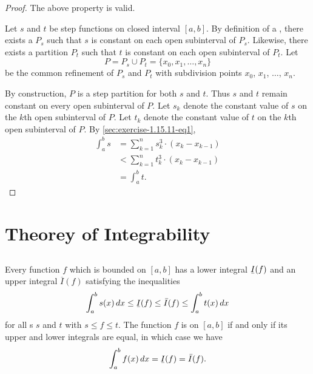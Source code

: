 \documentclass{report}
\newcommand{\ubar}[1]{\text{\b{$#1$}}}
\begin{document}
\begin{proof}

  The above property is valid.

  \divider

  Let $s$ and $t$ be step functions on closed interval $[a, b]$.
  By definition of a , there exists a 
    $P_s$ such that $s$ is constant on each open subinterval of $P_s$.
  Likewise, there exists a partition $P_t$ such that $t$ is constant on each
    open subinterval of $P_t$.
  Let $$P = P_s \cup P_t = \{x_0, x_1, \ldots, x_n\}$$ be the common refinement
    of $P_s$ and $P_t$ with subdivision points $x_0$, $x_1$, $\ldots$, $x_n$.

  By construction, $P$ is a step partition for both $s$ and $t$.
  Thus $s$ and $t$ remain constant on every open subinterval of $P$.
  Let $s_k$ denote the constant value of $s$ on the $k$th open subinterval of
    $P$.
  Let $t_k$ denote the constant value of $t$ on the $k$th open subinterval of
    $P$.
  By \eqref{sec:exercise-1.15.11-eq1},
    \begin{align*}
      \int_a^b s
        & = \sum_{k=1}^n s_k^3 \cdot (x_k - x_{k-1}) \\
        & < \sum_{k=1}^n t_k^3 \cdot (x_k - x_{k-1}) \\
        & = \int_a^b t.
    \end{align*}

\end{proof}

\chapter{Theorey of Integrability}%
\label{chap:theory-integrability}

\section{}%
\label{sec:theorem-1.9}

\begin{theorem}{1.9}

  Every function $f$ which is bounded on $[a, b]$ has a lower integral
    $\ubar{I}(f)$ and an upper integral $\overline{I}(f)$ satisfying the
    inequalities
    \begin{equation}
      \label{sec:theorem-1.9-eq1}
      \int_a^b s(x) \mathop{dx} \leq \ubar{I}(f) \leq
        \bar{I}(f) \leq \int_a^b t(x) \mathop{dx}
    \end{equation}
    for all s $s$ and $t$ with $s \leq f \leq t$.
  The function $f$ is  on $[a, b]$ if and only if
    its upper and lower integrals are equal, in which case we have
    $$\int_a^b f(x) \mathop{dx} = \ubar{I}(f) = \bar{I}(f).$$

\end{theorem}
\end{document}
